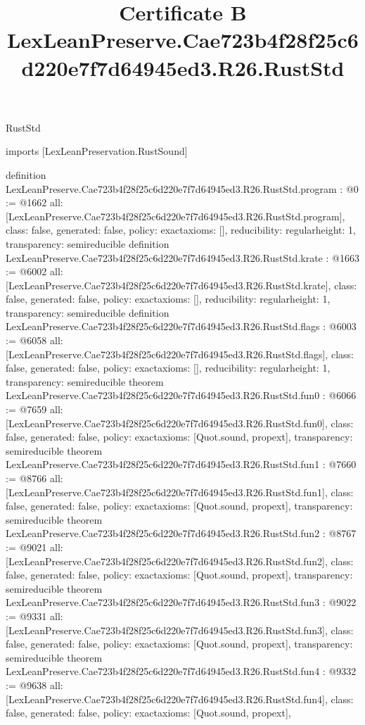 \begin{lexlean}{RustStd}
\title{Certificate B LexLeanPreserve.Cae723b4f28f25c6d220e7f7d64945ed3.R26.RustStd}
\begin{coremodule}
imports [LexLeanPreservation.RustSound]

definition LexLeanPreserve.Cae723b4f28f25c6d220e7f7d64945ed3.R26.RustStd.program : @0 := @1662 {
  all: [LexLeanPreserve.Cae723b4f28f25c6d220e7f7d64945ed3.R26.RustStd.program],
  class: false,
  generated: false,
  policy: exact{axioms: []},
  reducibility: regular{height: 1},
  transparency: semireducible
}
definition LexLeanPreserve.Cae723b4f28f25c6d220e7f7d64945ed3.R26.RustStd.krate : @1663 := @6002 {
  all: [LexLeanPreserve.Cae723b4f28f25c6d220e7f7d64945ed3.R26.RustStd.krate],
  class: false,
  generated: false,
  policy: exact{axioms: []},
  reducibility: regular{height: 1},
  transparency: semireducible
}
definition LexLeanPreserve.Cae723b4f28f25c6d220e7f7d64945ed3.R26.RustStd.flags : @6003 := @6058 {
  all: [LexLeanPreserve.Cae723b4f28f25c6d220e7f7d64945ed3.R26.RustStd.flags],
  class: false,
  generated: false,
  policy: exact{axioms: []},
  reducibility: regular{height: 1},
  transparency: semireducible
}
theorem LexLeanPreserve.Cae723b4f28f25c6d220e7f7d64945ed3.R26.RustStd.fun0 : @6066 := @7659 {
  all: [LexLeanPreserve.Cae723b4f28f25c6d220e7f7d64945ed3.R26.RustStd.fun0],
  class: false,
  generated: false,
  policy: exact{axioms: [Quot.sound, propext]},
  transparency: semireducible
}
theorem LexLeanPreserve.Cae723b4f28f25c6d220e7f7d64945ed3.R26.RustStd.fun1 : @7660 := @8766 {
  all: [LexLeanPreserve.Cae723b4f28f25c6d220e7f7d64945ed3.R26.RustStd.fun1],
  class: false,
  generated: false,
  policy: exact{axioms: [Quot.sound, propext]},
  transparency: semireducible
}
theorem LexLeanPreserve.Cae723b4f28f25c6d220e7f7d64945ed3.R26.RustStd.fun2 : @8767 := @9021 {
  all: [LexLeanPreserve.Cae723b4f28f25c6d220e7f7d64945ed3.R26.RustStd.fun2],
  class: false,
  generated: false,
  policy: exact{axioms: [Quot.sound, propext]},
  transparency: semireducible
}
theorem LexLeanPreserve.Cae723b4f28f25c6d220e7f7d64945ed3.R26.RustStd.fun3 : @9022 := @9331 {
  all: [LexLeanPreserve.Cae723b4f28f25c6d220e7f7d64945ed3.R26.RustStd.fun3],
  class: false,
  generated: false,
  policy: exact{axioms: [Quot.sound, propext]},
  transparency: semireducible
}
theorem LexLeanPreserve.Cae723b4f28f25c6d220e7f7d64945ed3.R26.RustStd.fun4 : @9332 := @9638 {
  all: [LexLeanPreserve.Cae723b4f28f25c6d220e7f7d64945ed3.R26.RustStd.fun4],
  class: false,
  generated: false,
  policy: exact{axioms: [Quot.sound, propext]},
}
\end{coremodule}
\end{lexlean}
